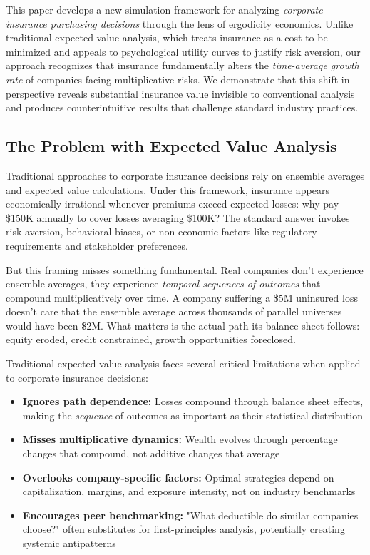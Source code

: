 \documentclass[11pt,letterpaper]{article}
\begin{document}
This paper develops a new simulation framework for analyzing \emph{corporate insurance purchasing decisions} through the lens of ergodicity economics. Unlike traditional expected value analysis, which treats insurance as a cost to be minimized and appeals to psychological utility curves to justify risk aversion, our approach recognizes that insurance fundamentally alters the \emph{time-average growth rate} of companies facing multiplicative risks. We demonstrate that this shift in perspective reveals substantial insurance value invisible to conventional analysis and produces counterintuitive results that challenge standard industry practices.

\subsection{The Problem with Expected Value Analysis}

Traditional approaches to corporate insurance decisions rely on ensemble averages and expected value calculations. Under this framework, insurance appears economically irrational whenever premiums exceed expected losses: why pay \$150K annually to cover losses averaging \$100K? The standard answer invokes risk aversion, behavioral biases, or non-economic factors like regulatory requirements and stakeholder preferences.

But this framing misses something fundamental. Real companies don't experience ensemble averages, they experience \emph{temporal sequences of outcomes} that compound multiplicatively over time. A company suffering a \$5M uninsured loss doesn't care that the ensemble average across thousands of parallel universes would have been \$2M. What matters is the actual path its balance sheet follows: equity eroded, credit constrained, growth opportunities foreclosed.

Traditional expected value analysis faces several critical limitations when applied to corporate insurance decisions:
\begin{itemize}
    \item \textbf{Ignores path dependence:} Losses compound through balance sheet effects, making the \emph{sequence} of outcomes as important as their statistical distribution
    \item \textbf{Misses multiplicative dynamics:} Wealth evolves through percentage changes that compound, not additive changes that average
    \item \textbf{Overlooks company-specific factors:} Optimal strategies depend on capitalization, margins, and exposure intensity, not on industry benchmarks
    \item \textbf{Encourages peer benchmarking:} "What deductible do similar companies choose?" often substitutes for first-principles analysis, potentially creating systemic antipatterns
\end{itemize}
\end{document}

